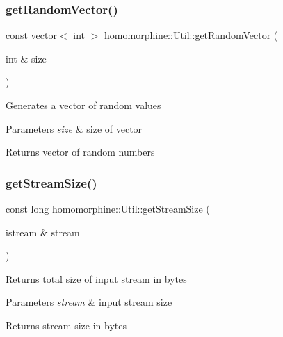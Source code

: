 \subsubsection{\texorpdfstring{getRandomVector()}{getRandomVector()}}
{\footnotesize\ttfamily const vector$<$ int $>$ homomorphine\+::\+Util\+::get\+Random\+Vector (\begin{DoxyParamCaption}\item[{int \&}]{size }\end{DoxyParamCaption})\hspace{0.3cm}{\ttfamily [static]}}

Generates a vector of random values


\begin{DoxyParams}{Parameters}
{\em size} & size of vector \\
\hline
\end{DoxyParams}
\begin{DoxyReturn}{Returns}
vector of random numbers 
\end{DoxyReturn}
\mbox{\label{classhomomorphine_1_1_util_acf2321afce14e9c20ca572159592e0e2}} 
\subsubsection{\texorpdfstring{getStreamSize()}{getStreamSize()}}
{\footnotesize\ttfamily const long homomorphine\+::\+Util\+::get\+Stream\+Size (\begin{DoxyParamCaption}\item[{istream \&}]{stream }\end{DoxyParamCaption})\hspace{0.3cm}{\ttfamily [static]}}

Returns total size of input stream in bytes


\begin{DoxyParams}{Parameters}
{\em stream} & input stream size \\
\hline
\end{DoxyParams}
\begin{DoxyReturn}{Returns}
stream size in bytes 
\end{DoxyReturn}
\mbox{\label{classhomomorphine_1_1_util_aba5af6d7356aca8c70ae4fb1e5d36b70}} 
